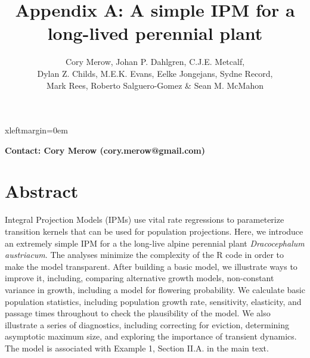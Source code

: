 \documentclass[11pt]{article}
\begin{document}
 


 {xleftmargin=0em}
\renewenvironment{Schunk}{\vspace{\topsep}}{\vspace{\topsep}}
\newlength{\fancyvrbtopsep}
\newlength{\fancyvrbpartopsep}
\makeatletter
\FV@AddToHook{\FV@ListParameterHook}{\topsep=\fancyvrbtopsep\partopsep=\fancyvrbpartopsep}
\makeatother


\title{Appendix A: A simple IPM for a long-lived perennial plant}
\author{Cory Merow, Johan P. Dahlgren, C.J.E. Metcalf,\\ Dylan Z. Childs, M.E.K. Evans, Eelke Jongejans, Sydne Record,\\ Mark Rees, Roberto Salguero-Gomez \& Sean M. McMahon}
\maketitle
\tableofcontents

\textbf{Contact: Cory Merow (cory.merow@gmail.com)}




\section*{Abstract}
Integral Projection Models (IPMs) use vital rate regressions to parameterize transition kernels that can be used for population projections. Here, we introduce an extremely simple IPM for a the long-live alpine perennial plant \emph{Dracocephalum austriacum}. The analyses minimize the complexity of the R code in order to make the model transparent. After building a basic model, we illustrate ways to improve it, including, comparing alternative growth models, non-constant variance in growth, including a model for flowering probability. We calculate basic population statistics, including population growth rate, sensitivity, elasticity, and passage times throughout to check the plausibility of the model. We also illustrate a series of diagnostics, including correcting for eviction, determining asymptotic maximum size, and exploring the importance of transient dynamics. The model is associated with Example 1, Section II.A. in the main text.
\end{document}
